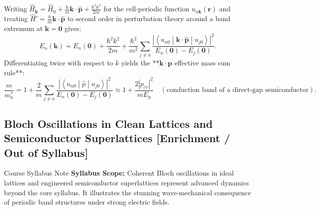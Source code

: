 \documentclass[11pt,a4paper]{article}
\newcommand{\mel}[3]{\left\langle #1 \middle| #2 \middle| #3 \right\rangle}
\newcommand{\abs}[1]{\left|#1\right|}
\newcommand{\vb}[1]{\mathbf{#1}}
\newcommand{\hb}{\hbar}
\newcommand{\hbarsq}{\hb^2}
\newcommand{\kk}{\mathbf{k}}
\newcommand{\rvec}{\mathbf{r}}
\begin{document}
Writing $\hat{H}_{\kk} = \hat{H}_0 + \frac{\hb}{m}\kk\cdot\hat{\vb{p}} + \frac{\hbarsq k^2}{2m}$ for the cell-periodic function $u_{n\kk}(\rvec)$ and treating $\hat{H}' = \frac{\hb}{m}\kk\cdot\hat{\vb{p}}$ to second order in perturbation theory around a band extremum at $\kk=\vb{0}$ gives:
\begin{equation}
    E_n(\kk) = E_n(\vb{0}) + \frac{\hbarsq k^2}{2m} + \frac{\hbarsq}{m^2}\sum_{j \neq n}\frac{\abs{\mel{u_{n0}}{\kk\cdot\hat{\vb{p}}}{u_{j0}}}^2}{E_n(\vb{0}) - E_j(\vb{0})}.
\end{equation}
Differentiating twice with respect to $k$ yields the **$\kk\cdot\vb{p}$ effective mass sum rule**:
\begin{equation}
    \boxed{\frac{m}{m_n^*} = 1 + \frac{2}{m}\sum_{j \neq n}\frac{\abs{\mel{u_{n0}}{\hat{p}}{u_{j0}}}^2}{E_n(\vb{0}) - E_j(\vb{0})} \approx 1 + \frac{2\abs{p_{cv}}^2}{m E_g} \quad (\text{conduction band of a direct-gap semiconductor}).}
    \label{eq:kp_sum_rule_master}
\end{equation}

\subsection{Bloch Oscillations in Clean Lattices and Semiconductor Superlattices \texorpdfstring{{\normalfont\normalsize\color{purple!75!black}\textbf{[Enrichment / Out of Syllabus]}}}{[Enrichment / Out of Syllabus]}}

\begin{enrichmentbox}{Course Syllabus Note}
\textbf{Syllabus Scope:} Coherent Bloch oscillations in ideal lattices and engineered semiconductor superlattices represent advanced dynamics beyond the core syllabus. It illustrates the stunning wave-mechanical consequence of periodic band structures under strong electric fields.
\end{enrichmentbox}
\end{document}

